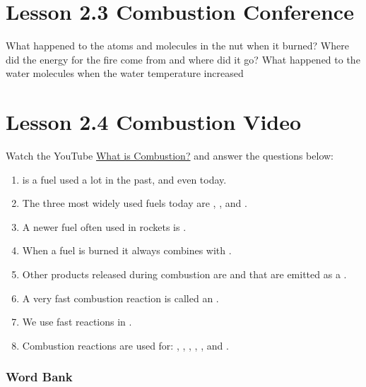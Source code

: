 \documentclass[answers,12pt]{exam}
\begin{document}
\section*{Lesson 2.3 Combustion Conference}

\begin{questions}
    \question What happened to the atoms and molecules in the nut when it burned?
    \vspace{4cm}
    \question Where did the energy for the fire come from and where did it go? 
    \vspace{4cm}
    \question What happened to the water molecules when the water temperature increased
    \vspace{4cm}
\end{questions}

\newpage

\section*{Lesson 2.4 Combustion Video}

Watch the YouTube \href{https://www.youtube.com/watch?v=xd1alir07q4}{What is Combustion?} and answer the questions below:


\begin{enumerate}
    \item  \fillin[wood] is a fuel used a lot in the past, and even today.
    \item  The three most widely used fuels today are \fillin[coal], \fillin[oil], and .
    \item  A newer fuel often used in rockets is \fillin[hydrogen].
    \item  When a fuel is burned it always combines with \fillin[oxygen].
    \item  Other products released during combustion are  and \fillin[water] that are emitted as a \fillin[gas].
    \item  A very fast combustion reaction is called an \fillin[explosion].
    \item  We use fast reactions in .
    \item  Combustion reactions are used for:  \fillin[cooking], \fillin[manufacturing], , , , and \fillin[heating].
\end{enumerate}

\subsubsection*{Word Bank}
\end{document}
